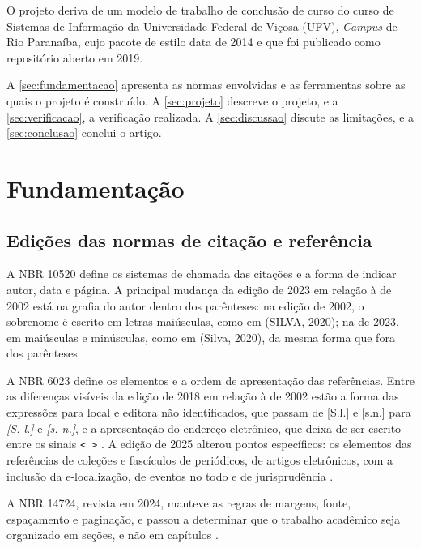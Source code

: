\documentclass[
	article,
	12pt,
	oneside,
	a4paper,
	english,
	brazil,
]{abntex2}
\begin{document}
O projeto deriva de um modelo de trabalho de conclusão de curso do curso de Sistemas de Informação da Universidade Federal de Viçosa (UFV), \textit{Campus} de Rio Paranaíba, cujo pacote de estilo data de 2014 e que foi publicado como repositório aberto em 2019.

A \autoref{sec:fundamentacao} apresenta as normas envolvidas e as ferramentas sobre as quais o projeto é construído. A \autoref{sec:projeto} descreve o projeto, e a \autoref{sec:verificacao}, a verificação realizada. A \autoref{sec:discussao} discute as limitações, e a \autoref{sec:conclusao} conclui o artigo.

\section{Fundamentação}\label{sec:fundamentacao}

\subsection{Edições das normas de citação e referência}

A NBR 10520 define os sistemas de chamada das citações e a forma de indicar autor, data e página. A principal mudança da edição de 2023 em relação à de 2002 está na grafia do autor dentro dos parênteses: na edição de 2002, o sobrenome é escrito em letras maiúsculas, como em (SILVA, 2020); na de 2023, em maiúsculas e minúsculas, como em (Silva, 2020), da mesma forma que fora dos parênteses \cite{abnt10520,abnt10520-2002}.

A NBR 6023 define os elementos e a ordem de apresentação das referências. Entre as diferenças visíveis da edição de 2018 em relação à de 2002 estão a forma das expressões para local e editora não identificados, que passam de [S.l.] e [s.n.] para \textit{[S. l.]} e \textit{[s. n.]}, e a apresentação do endereço eletrônico, que deixa de ser escrito entre os sinais \texttt{< >} \cite{abnt6023,abnt6023-2002}. A edição de 2025 alterou pontos específicos: os elementos das referências de coleções e fascículos de periódicos, de artigos eletrônicos, com a inclusão da e-localização, de eventos no todo e de jurisprudência \cite{abnt6023-2025}.

A NBR 14724, revista em 2024, manteve as regras de margens, fonte, espaçamento e paginação, e passou a determinar que o trabalho acadêmico seja organizado em seções, e não em capítulos \cite{abnt14724}.
\end{document}
